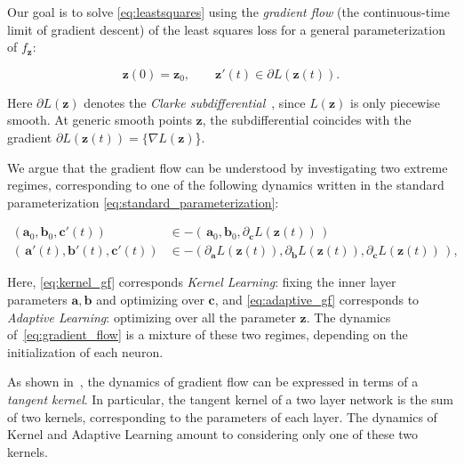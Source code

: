 Our goal is to solve \eqref{eq:leastsquares} using the \emph{gradient flow} (the continuous-time limit of gradient descent) of the least squares loss for a general parameterization of $f_{\bm z}$:

\begin{equation}\label{eq:gradient_flow}
    \bm z(0) = \bm z_0, \qquad \bm z'(t) \in \partial L(\bm z(t)).
\end{equation}

Here $\partial L(\bm z)$ denotes the \emph{Clarke subdifferential}~\cite{clarke1975generalized}, since $L(\bm z)$ is only piecewise smooth. At generic smooth points $\bm z$, the subdifferential coincides with the gradient $\partial L(\bm z(t)) = \{\nabla L(\bm z)$\}. 



We argue that the gradient flow can be understood by investigating two extreme regimes, corresponding to one of the following dynamics written in the standard parameterization \eqref{eq:standard_parameterization}:

\begin{align}
    (\bm a_0, \bm b_0, \bm c'(t)) & \in -(\,\bm a_0, \bm b_0, \partial_{\bm c} L(\bm z(t))\,)\label{eq:kernel_gf} \\[.3cm]
    (\, \bm a'(t), \bm b'(t), \bm c'(t)) &\in -(\partial_{\bm a} L(\bm z(t)), \partial_{\bm b} L(\bm z(t)), \partial_{\bm c} L(\bm z(t))\, ),\label{eq:adaptive_gf}
\end{align}

Here, \eqref{eq:kernel_gf} corresponds \emph{Kernel Learning}: fixing the inner layer parameters $\bm a, \bm b$ and optimizing over $\bm c$, and \eqref{eq:adaptive_gf} corresponds to \emph{Adaptive Learning}: optimizing over all the parameter $\bm z$. The dynamics of~\eqref{eq:gradient_flow} is a mixture of these two regimes, depending on the initialization of each neuron.

\begin{remark}
As shown in~\cite{NTKJacot}, the dynamics of gradient flow can be expressed in terms of a \emph{tangent kernel}. In particular, the tangent kernel of a two layer network is the sum of two kernels, corresponding to the parameters of each layer. The dynamics of Kernel and Adaptive Learning amount to considering only one of these two kernels.
\end{remark}




